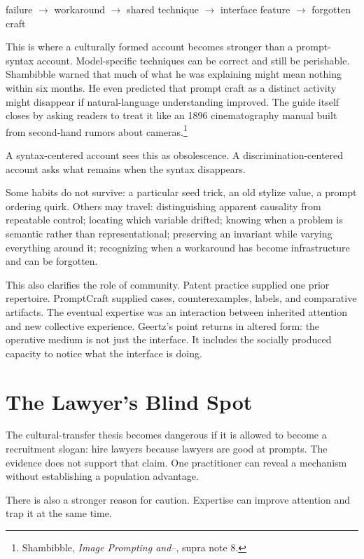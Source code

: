 \documentclass[11pt]{article}
\begin{document}
\begin{center}
failure $\rightarrow$ workaround $\rightarrow$ shared technique $\rightarrow$ interface feature $\rightarrow$ forgotten craft
\end{center}

This is where a culturally formed account becomes stronger than a prompt-syntax account. Model-specific techniques can be correct and still be perishable. Shambibble warned that much of what he was explaining might mean nothing within six months. He even predicted that prompt craft as a distinct activity might disappear if natural-language understanding improved. The guide itself closes by asking readers to treat it like an 1896 cinematography manual built from second-hand rumors about cameras.\footnote{Shambibble, \textit{Image Prompting and--}, supra note 8.}

A syntax-centered account sees this as obsolescence. A discrimination-centered account asks what remains when the syntax disappears.

Some habits do not survive: a particular seed trick, an old stylize value, a prompt ordering quirk. Others may travel: distinguishing apparent causality from repeatable control; locating which variable drifted; knowing when a problem is semantic rather than representational; preserving an invariant while varying everything around it; recognizing when a workaround has become infrastructure and can be forgotten.

This also clarifies the role of community. Patent practice supplied one prior repertoire. PromptCraft supplied cases, counterexamples, labels, and comparative artifacts. The eventual expertise was an interaction between inherited attention and new collective experience. Geertz's point returns in altered form: the operative medium is not just the interface. It includes the socially produced capacity to notice what the interface is doing.

\section{The Lawyer's Blind Spot}

The cultural-transfer thesis becomes dangerous if it is allowed to become a recruitment slogan: hire lawyers because lawyers are good at prompts. The evidence does not support that claim. One practitioner can reveal a mechanism without establishing a population advantage.

There is also a stronger reason for caution. Expertise can improve attention and trap it at the same time.
\end{document}
